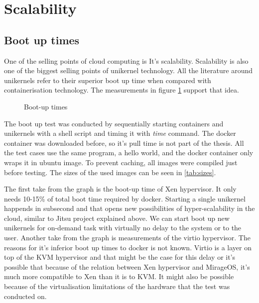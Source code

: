 \section{Scalability}

\subsection{Boot up times}
One of the selling points of cloud computing is It's scalability. Scalability  is also one of the biggest selling points of unikernel technology. All the literature around unikernels refer to their superior boot up time when compared with containerisation technology. The measurements in figure \ref{fig:boot-up} support that idea. 
\begin{figure}[htpb]
  \centering
    \caption{Boot-up times}\label{fig:boot-up}
  \end{figure}

The boot up test was conducted by sequentially starting containers and unikernels with a shell script and timing it with \textit{time} command. The docker container was downloaded before, so it's pull time is not part of the thesis. All the test cases use the same program, a hello world, and the docker container only wraps it in ubuntu image. To prevent caching, all images were compiled just before testing. The sizes of the used images can be seen in \ref{tab:sizes}.

The first take from the graph is the boot-up time of Xen hypervisor. It only needs 10-15\% of total boot time required by docker. Starting a single unikernel happends in subsecond and that opens new possibilities of hyper-scalability in the cloud, similar to Jitsu project explained above. We can start boot up new unikernels for on-demand task with virtually no delay to the system or to the user. Another take from the graph is measurements of the virtio\cite{virtio} hypervisor. The reasons for it's inferior boot up times to docker is not known. Virtio is a layer on top of the KVM hypervisor and that might be the case for this delay or it's possible that because of the relation between Xen hypervisor and MirageOS, it's much more compatible to Xen than it is to KVM. It might also be possible because of the virtualisation limitations of the hardware that the test was conducted on.

